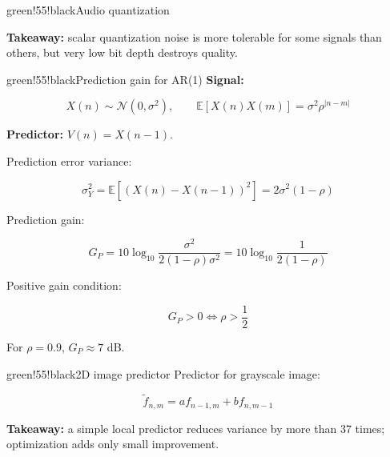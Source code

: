 \begin{calloutbox}{green!55!black}{Audio quantization}
\begin{center}
\end{center}

\textbf{Takeaway:} scalar quantization noise is more tolerable for some signals than others, but very low bit depth destroys quality.
\end{calloutbox}

\begin{calloutbox}{green!55!black}{Prediction gain for AR(1)}
\textbf{Signal:}

\[
X(n)\sim\mathcal{N}(0,\sigma^2), \qquad
\mathbb{E}[X(n)X(m)]=\sigma^2\rho^{|n-m|}
\]

\textbf{Predictor:} $V(n)=X(n-1)$.

Prediction error variance:

\[
\sigma_Y^2
=\mathbb{E}[(X(n)-X(n-1))^2]
=2\sigma^2(1-\rho)
\]

Prediction gain:

\[
G_P=10\log_{10}\frac{\sigma^2}{2(1-\rho)\sigma^2}
=10\log_{10}\frac{1}{2(1-\rho)}
\]

Positive gain condition:

\[
G_P>0 \Leftrightarrow \rho>\frac{1}{2}
\]

For $\rho=0.9$, $G_P\approx7$ dB.
\end{calloutbox}

\begin{calloutbox}{green!55!black}{2D image predictor}
Predictor for grayscale image:

\[
\tilde{f}_{n,m}=a f_{n-1,m}+b f_{n,m-1}
\]

\begin{center}
\end{center}

\textbf{Takeaway:} a simple local predictor reduces variance by more than 37 times; optimization adds only small improvement.
\end{calloutbox}

